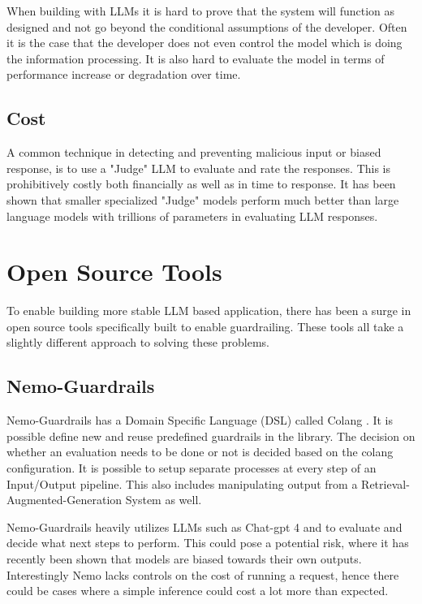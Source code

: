 \documentclass[11pt]{article}
\begin{document}
When building with LLMs it is hard to prove that the system will function as designed and not go beyond the conditional assumptions of the developer. Often it is the case that the developer does not even control the model which is doing the information processing.
It is also hard to evaluate the model in terms of performance increase or degradation over time.

\subsection{ Cost }
A common technique in detecting and preventing malicious input or biased response, is to use a "Judge" LLM to evaluate and rate the responses. This is prohibitively costly both financially as well as in time to response.
It has been shown that smaller specialized "Judge" models perform much better than large language models with trillions of parameters in evaluating LLM responses.

\section{ Open Source Tools }
To enable building more stable LLM based application, there has been a surge in open source tools specifically built to enable guardrailing. These tools all take a slightly different approach to solving these problems.

\subsection{ Nemo-Guardrails }

Nemo-Guardrails \cite{rebedea-etal-2023-nemo} has a Domain Specific Language (DSL) called Colang  . It is possible define new and reuse predefined guardrails in the library. The decision on whether an evaluation needs to be done or not is decided based on the colang configuration. It is possible to setup separate processes at every step of an Input/Output pipeline. This also includes manipulating output from a Retrieval-Augmented-Generation System as well.

Nemo-Guardrails heavily utilizes LLMs such as Chat-gpt 4 and to evaluate and decide what next steps to perform. This could pose a potential risk, where it has recently been shown that models are biased towards their own outputs. Interestingly Nemo lacks controls on the cost of running a request, hence there could be cases where a simple inference could cost a lot more than expected.
\end{document}

